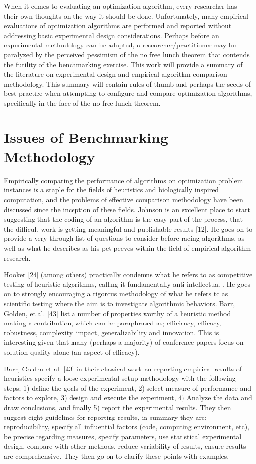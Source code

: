 \documentclass[a4paper, 11pt]{article}
\begin{document}
When it comes to evaluating an optimization algorithm, every researcher has their own thoughts on the way it should be done. Unfortunately, many empirical evaluations of optimization algorithms are performed and reported without addressing basic experimental design considerations. Perhaps before an experimental methodology can be adopted, a researcher/practitioner may be paralyzed by the perceived pessimism of the no free lunch theorem that contends the futility of the benchmarking exercise. This work will provide a summary of the literature on experimental design and empirical algorithm comparison methodology. This summary will contain rules of thumb and perhaps the seeds of best practice when attempting to configure and compare optimization algorithms, specifically in the face of the no free lunch theorem.

% 
% 
\section{Issues of Benchmarking Methodology}
Empirically	comparing	the	performance	of algorithms on optimization problem instances is a staple for the fields of heuristics and biologically inspired computation, and the problems of effective comparison methodology have been discussed since the inception of these fields. Johnson is an excellent place to start suggesting that the coding of an algorithm is the easy part of the process, that the difficult work is getting meaningful and publishable results [12]. He goes on to provide a very through list of questions to consider before racing algorithms, as well as what he describes as his pet peeves within the field of empirical algorithm research.

Hooker [24] (among others) practically condemns what he refers to as competitive testing of heuristic algorithms, calling it fundamentally anti-intellectual . He goes on to strongly encouraging a rigorous methodology of what he refers to as scientific testing where the aim is to investigate algorithmic behaviors. Barr, Golden, et al. [43] list a number of properties worthy of a heuristic method making a contribution, which can be paraphrased as; efficiency, efficacy, robustness, complexity, impact, generalizability and innovation. This is interesting given that many (perhaps a majority) of conference papers focus on solution quality alone (an aspect of efficacy).

Barr, Golden et al. [43] in their classical work on reporting empirical results of heuristics specify a loose experimental setup methodology with the following steps; 1) define the goals of the experiment, 2) select measure of performance and factors to explore, 3) design and execute the experiment, 4) Analyze the data and draw conclusions, and finally 5) report the experimental results. They then suggest eight guidelines for reporting results, in summary they are; reproducibility, specify all influential factors (code, computing environment, etc), be precise regarding measures, specify parameters, use statistical experimental design, compare with other methods, reduce variability of results, ensure results are comprehensive. They then go on to clarify these points with examples.
\end{document}

